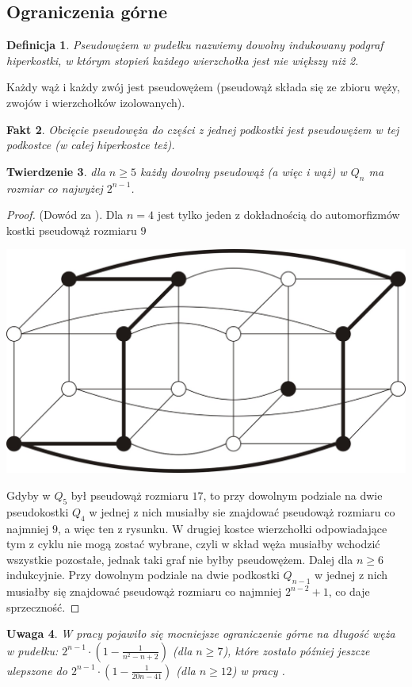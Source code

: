 \documentclass{pracamgr}
\newtheorem{theorem}{Twierdzenie}[chapter]
\newtheorem{defi}[theorem]{Definicja} %
\newtheorem{remark}[theorem]{Uwaga}
\newtheorem{fact}[theorem]{Fakt}
\begin{document}
    \subsection{Ograniczenia górne}
     \begin{defi}\label{pseudowąż}
      \emph{Pseudowężem} w pudełku nazwiemy dowolny indukowany podgraf hiperkostki, w którym stopień każdego wierzchołka jest nie większy niż 2. 
     \end{defi}
     Każdy wąż i każdy zwój jest pseudowężem (pseudowąż składa się ze zbioru węży, zwojów i wierzchołków izolowanych).
     \begin{fact}
      Obcięcie pseudowęża do części z jednej podkostki jest pseudowężem w tej podkostce (w całej hiperkostce też).
     \end{fact}
    \begin{theorem}
     dla $n\ge5$ każdy dowolny pseudowąż (a więc i wąż) w $Q_n$ ma rozmiar co najwyżej $2^{n-1}$.
    \end{theorem}
    \begin{proof}
     (Dowód za \cite{Snake1}).
     Dla $n=4$ jest tylko jeden z dokładnością do automorfizmów kostki pseudowąż rozmiaru $9$
     \begin{center}
      \includegraphics[scale=0.4]{img/pseudoS_4.jpg}
     \end{center}
     Gdyby w $Q_5$ był pseudowąż rozmiaru $17$, to przy dowolnym podziale na dwie pseudokostki $Q_4$ w jednej z nich musiałby sie znajdować pseudowąż
     rozmiaru co najmniej $9$, a więc ten z rysunku. W drugiej kostce wierzchołki odpowiadające tym z cyklu nie mogą zostać wybrane,
     czyli w skład węża musiałby wchodzić wszystkie pozostałe, jednak taki graf nie byłby pseudowężem.\newline
     Dalej dla $n\ge6$ indukcyjnie. Przy dowolnym podziale na dwie podkostki $Q_{n-1}$ w jednej z nich musiałby się znajdować pseudowąż rozmiaru co najmniej
     $2^{n-2}+1$, co daje sprzeczność.
    \end{proof}
    \begin{remark}
     W pracy \cite{Snake3} pojawiło się mocniejsze ograniczenie górne na długość węża w pudełku:
     $2^{n-1}\cdot(1-\frac{1}{n^2-n+2})$ (dla $n\ge7$), które zostało później jeszcze ulepszone do\newline
     $2^{n-1}\cdot(1-\frac{1}{20n-41})$ (dla $n\ge12$) w pracy \cite{Snake4}.
    \end{remark}
\end{document}
